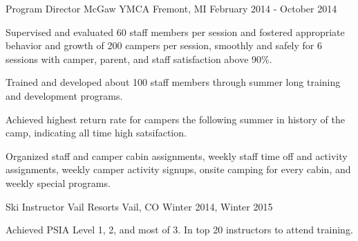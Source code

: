 

\begin{cventries}

  \cventry
    {Program Director} %
    {McGaw YMCA} %
    {Fremont, MI} %
    {February 2014 - October 2014} %
    {
      \begin{cvitems} %
        \item {Supervised and evaluated 60 staff members per session and fostered appropriate behavior and growth of 200 campers per session, smoothly and safely for 6 sessions with camper, parent, and staff satisfaction above 90\%.}
        \item {Trained and developed about 100 staff members through summer long training and development programs.}
        \item {Achieved highest return rate for campers the following summer in history of the camp, indicating all time high satsifaction.}
        \item {Organized staff and camper cabin assignments, weekly staff time off and activity assignments, weekly camper activity signups, onsite camping for every cabin, and weekly special programs.}
      \end{cvitems}
    }
    
 \cventry
    {Ski Instructor} %
    {Vail Resorts} %
    {Vail, CO} %
    {Winter 2014, Winter 2015} %
    {
      \begin{cvitems} %
        \item {Achieved PSIA Level 1, 2, and most of 3. In top 20 instructors to attend training.}
      \end{cvitems}
    }



\end{cventries}

